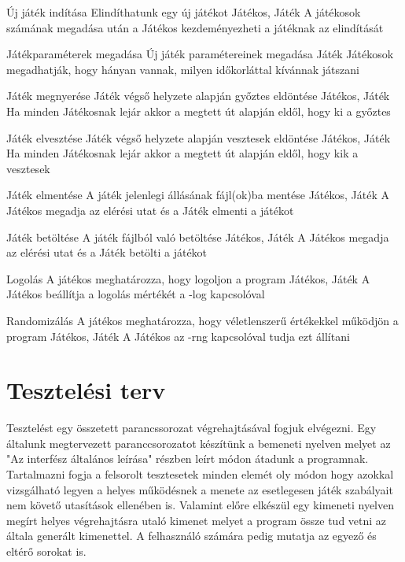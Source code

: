 \usecase%
{Új játék indítása}%
{Elindíthatunk egy új játékot}%
{Játékos, Játék}%
{A játékosok számának megadása után a Játékos kezdeményezheti a játéknak az elindítását}

\usecase%
{Játékparaméterek megadása}%
{Új játék paramétereinek megadása}%
{Játék}%
{Játékosok megadhatják, hogy hányan vannak, milyen időkorláttal kívánnak játszani}

\usecase%
{Játék megnyerése}%
{Játék végső helyzete alapján győztes eldöntése}%
{Játékos, Játék}%
{Ha minden Játékosnak lejár akkor a megtett út alapján eldől, hogy ki a győztes}

\usecase%
{Játék elvesztése}%
{Játék végső helyzete alapján vesztesek eldöntése}%
{Játékos, Játék}%
{Ha minden Játékosnak lejár akkor a megtett út alapján eldől, hogy kik a vesztesek}

\usecase%
{Játék elmentése}
{A játék jelenlegi állásának fájl(ok)ba mentése}
{Játékos, Játék}
{A Játékos megadja az elérési utat és a Játék elmenti a játékot}

\usecase%
{Játék betöltése}
{A játék fájlból való betöltése}
{Játékos, Játék}
{A Játékos megadja az elérési utat és a Játék betölti a játékot}

\usecase%
{Logolás}
{A játékos meghatározza, hogy logoljon a program}
{Játékos, Játék}
{A Játékos beállítja a logolás mértékét a -log kapcsolóval}

\usecase%
{Randomizálás}
{A játékos meghatározza, hogy véletlenszerű értékekkel működjön a program}
{Játékos, Játék}
{A Játékos az -rng kapcsolóval tudja ezt állítani}


\section{Tesztelési terv}

Tesztelést egy összetett parancssorozat végrehajtásával fogjuk elvégezni. Egy általunk megtervezett paranccsorozatot készítünk a bemeneti nyelven melyet az "Az interfész általános leírása" részben leírt módon átadunk a programnak. Tartalmazni fogja a felsorolt tesztesetek minden elemét oly módon hogy azokkal vizsgálható legyen a helyes működésnek a menete az esetlegesen játék szabályait nem követő utasítások ellenében is. Valamint előre elkészül egy kimeneti nyelven megírt helyes végrehajtásra utaló kimenet melyet a program össze tud vetni az általa generált kimenettel. A felhasználó számára pedig mutatja az egyező és eltérő sorokat is. 

